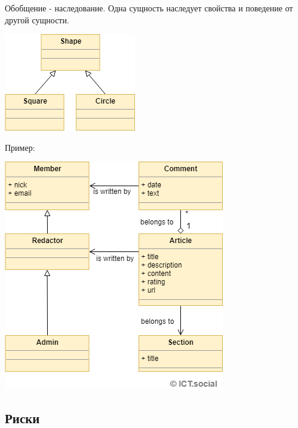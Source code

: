 Обобщение - наследование. Одна сущность наследует свойства и поведение от другой сущности.
\begin{center}
    \includegraphics[width=.2\textwidth]{extends.png}  
\end{center}

Пример:
\begin{center}
    \includegraphics[width=.4\textwidth]{domenex.png}  
\end{center}

\subsection{Риски}

